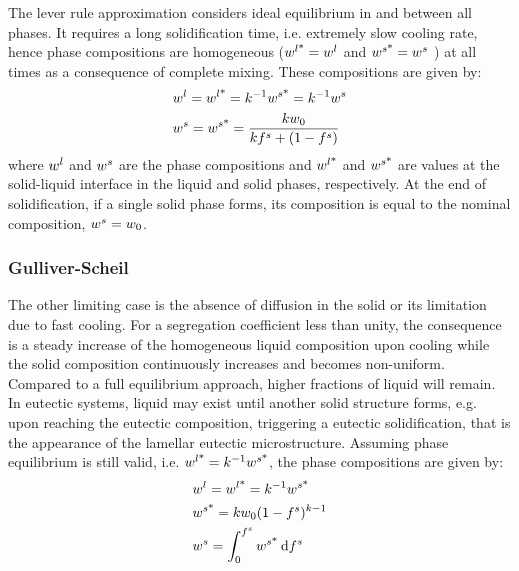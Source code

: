 The lever rule approximation considers ideal equilibrium in and between all phases. It requires a long solidification time, i.e. extremely slow cooling rate, hence phase compositions are 
homogeneous ($ {w}^{l \text{*}}  = {w}^l$ and $ {w}^{s \text{*}}  = {w}^s$ ) at all times as a consequence of complete mixing. 
These compositions are given by:
\begin{align}
\label{eq:leverrule}
& {w}^l= {w}^{l \text{*}}  = k^{-1} {w}^{s \text{*}}  = k^{-1} {w}^s \\
& {w}^s= {w}^{s \text{*}}  = \frac{k {w}_0}{k{f^s} + (1-{f^s})}
\end{align}
where ${w}^l$ and ${w}^s$ are the phase compositions and ${w}^{l \text{*}} $ and ${w}^{s \text{*}} $ are values at the solid-liquid interface in 
the liquid and solid phases, respectively.  At the end of solidification, if a single solid phase forms, its composition is equal to the nominal composition, ${w}^s = {w}_0$.

\subsubsection*{Gulliver-Scheil}

The other limiting case is the absence of diffusion in the solid or its limitation due to fast cooling.
For a segregation coefficient less than unity, the consequence is a steady increase  of the homogeneous liquid composition
upon cooling while the solid composition continuously increases and becomes non-uniform.
Compared to a full equilibrium approach, higher fractions of liquid will remain. In eutectic systems, liquid may exist until 
another solid structure forms, e.g. upon reaching the eutectic composition, 
triggering a eutectic solidification, that is the appearance of the lamellar eutectic microstructure. 
Assuming phase equilibrium is still valid, i.e. ${w}^{l \text{*}} =k^{-1} {w}^{s \text{*}} $, the phase compositions are given by:
\begin{align}
\label{eq:scheil1}
& {w}^l= {w}^{l \text{*}}  = k^{-1} {w}^{s \text{*}}  \\
\label{eq:scheil2}
& {w}^{s \text{*}} = k {w}_0 (1-{f^s})^{k-1} \\
\label{eq:scheil3}
& {w}^s = \int_{0}^{f^s} {w}^{s \text{*}} \: \mathrm{d}f^s
\end{align}
